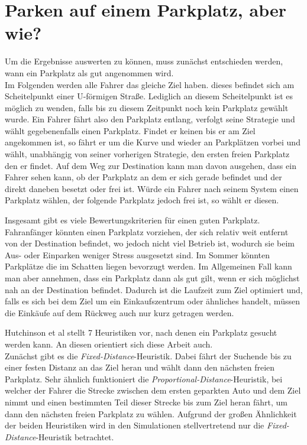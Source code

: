 \section{Parken auf einem Parkplatz, aber wie?}

Um die Ergebnisse auswerten zu können, muss zunächst entschieden werden, wann ein Parkplatz als gut angenommen wird.\\
Im Folgenden werden alle Fahrer das gleiche Ziel haben. dieses befindet sich am Scheitelpunkt einer U-förmigen Straße. Lediglich an diesem Scheitelpunkt ist es möglich zu wenden, falls bis zu diesem Zeitpunkt noch kein Parkplatz gewählt wurde. Ein Fahrer fährt also den Parkplatz entlang, verfolgt seine Strategie und wählt gegebenenfalls einen Parkplatz. Findet er keinen bis er am Ziel angekommen ist, so fährt er um die Kurve und wieder an Parkplätzen vorbei und wählt, unabhängig von seiner vorherigen Strategie, den ersten freien Parkplatz den er findet. Auf dem Weg zur Destination kann man davon ausgehen, dass ein Fahrer sehen kann, ob der Parkplatz an dem er sich gerade befindet und der direkt daneben besetzt oder frei ist. Würde ein Fahrer nach seinem System einen Parkplatz wählen, der folgende Parkplatz jedoch frei ist, so wählt er diesen.

Insgesamt gibt es viele Bewertungskriterien für einen guten Parkplatz. Fahranfänger könnten einen Parkplatz vorziehen, der sich relativ weit entfernt von der Destination befindet, wo jedoch nicht viel Betrieb ist, wodurch sie beim Aus- oder Einparken weniger Stress ausgesetzt sind. Im Sommer könnten Parkplätze die im Schatten liegen bevorzugt werden. Im Allgemeinen Fall kann man aber annehmen, dass ein Parkplatz dann als gut gilt, wenn er sich möglichst nah an der Destination befindet. Dadurch ist die Laufzeit zum Ziel optimiert und, falls es sich bei dem Ziel um ein Einkaufszentrum oder ähnliches handelt, müssen die Einkäufe auf dem Rückweg auch nur kurz getragen werden.

Hutchinson et al \cite[A Selection of Simple Parking Heuristics, S. 10]{hutchinson} stellt 7 Heuristiken vor, nach denen ein Parkplatz gesucht werden kann. An diesen orientiert sich diese Arbeit auch. \\
Zunächst gibt es die \emph{Fixed-Distance}-Heuristik. Dabei fährt der Suchende bis zu einer festen Distanz an das Ziel heran und wählt dann den nächsten freien Parkplatz. Sehr ähnlich funktioniert die \emph{Proportional-Distance}-Heuristik, bei welcher der Fahrer die Strecke zwischen dem ersten geparkten Auto und dem Ziel nimmt und einen bestimmten Teil dieser Strecke bis zum Ziel heran fährt, um dann den nächsten freien Parkplatz zu wählen. Aufgrund der großen Ähnlichkeit der beiden Heuristiken wird in den Simulationen stellvertretend nur die \emph{Fixed-Distance}-Heuristik betrachtet.

